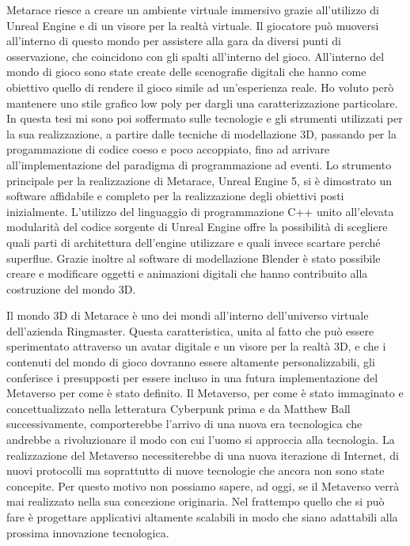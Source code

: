 Metarace riesce a creare un ambiente virtuale immersivo grazie all'utilizzo di Unreal Engine e di un visore per la realtà virtuale.
%
Il giocatore può muoversi all'interno di questo mondo per assistere alla gara da diversi punti di osservazione, che coincidono con gli spalti all'interno del gioco.
%
All'interno del mondo di gioco sono state create delle scenografie digitali che hanno come obiettivo quello di rendere il gioco simile ad un'esperienza reale.
%
Ho voluto però mantenere uno stile grafico low poly per dargli una caratterizzazione particolare.
%
In questa tesi mi sono poi soffermato sulle tecnologie e gli strumenti utilizzati per la sua realizzazione, a partire dalle tecniche di modellazione 3D, passando per la progammazione di codice coeso e poco accoppiato, fino ad arrivare all'implementazione del paradigma di programmazione ad eventi. 
%
Lo strumento principale per la realizzazione di Metarace, Unreal Engine 5, si è dimostrato un software affidabile e completo per la realizzazione degli obiettivi posti inizialmente.
%
L'utilizzo del linguaggio di programmazione C++ unito all'elevata modularità del codice sorgente di Unreal Engine offre la possibilità di scegliere quali parti di architettura dell'engine utilizzare e quali invece scartare perché superflue.
%
Grazie inoltre al software di modellazione Blender è stato possibile creare e modificare oggetti e animazioni digitali che hanno contribuito alla costruzione del mondo 3D.

Il mondo 3D di Metarace è uno dei mondi all'interno dell'universo virtuale dell'azienda Ringmaster. 
%
Questa caratteristica, unita al fatto che può essere sperimentato attraverso un avatar digitale e un visore per la realtà 3D, e che i contenuti del mondo di gioco dovranno essere altamente personalizzabili, gli conferisce i presupposti per essere incluso in una futura implementazione del Metaverso per come è stato definito.
%
Il Metaverso, per come è stato immaginato e concettualizzato nella letteratura Cyberpunk prima e da Matthew Ball successivamente, comporterebbe l'arrivo di una nuova era tecnologica che andrebbe a rivoluzionare il modo con cui l'uomo si approccia alla tecnologia.
%
La realizzazione del Metaverso necessiterebbe di una nuova iterazione di Internet, di nuovi protocolli ma soprattutto di nuove tecnologie che ancora non sono state concepite.
%
Per questo motivo non possiamo sapere, ad oggi, se il Metaverso verrà mai realizzato nella sua concezione originaria.
%
Nel frattempo quello che si può fare è progettare applicativi altamente scalabili in modo che siano adattabili alla prossima innovazione tecnologica.